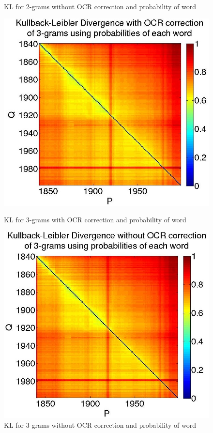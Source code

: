 \begin{figure}[H]
\begin{minipage}[b]{0.5\linewidth}
        \caption{KL for 2-grams without OCR correction and probability of word}
        \label{KL-PN2}
    \end{minipage}\hfill
\end{figure}

\begin{figure}[H]
    \begin{minipage}[b]{0.48\linewidth}
        \includegraphics[scale=0.25]{Pictures/kullback-leibler/KL_3-grams_with_correction_proba.jpg}
        \caption{KL for 3-grams with OCR correction and probability of word}
        \label{KL-PC3}
    \end{minipage}\hfill
    \begin{minipage}[b]{0.5\linewidth}
        \includegraphics[scale=0.25]{Pictures/kullback-leibler/KL_3-grams_without_correction_proba.jpg}
        \caption{KL for 3-grams without OCR correction and probability of word}
        \label{KL-PN3}
    \end{minipage}\hfill
\end{figure}

